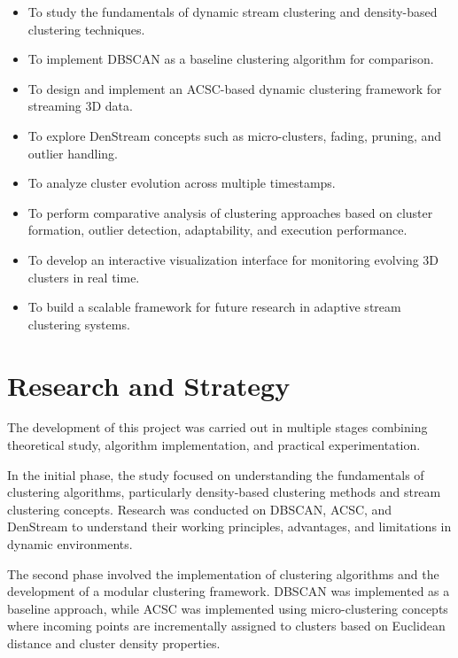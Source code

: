 \documentclass[12pt,a4paper]{report}
\begin{document}
\begin{itemize}

\item To study the fundamentals of dynamic stream clustering and density-based clustering techniques.

\item To implement DBSCAN as a baseline clustering algorithm for comparison.

\item To design and implement an ACSC-based dynamic clustering framework for streaming 3D data.

\item To explore DenStream concepts such as micro-clusters, fading, pruning, and outlier handling.

\item To analyze cluster evolution across multiple timestamps.

\item To perform comparative analysis of clustering approaches based on cluster formation, outlier detection, adaptability, and execution performance.

\item To develop an interactive visualization interface for monitoring evolving 3D clusters in real time.

\item To build a scalable framework for future research in adaptive stream clustering systems.

\end{itemize}

\section{Research and Strategy}

The development of this project was carried out in multiple stages combining theoretical study, algorithm implementation, and practical experimentation.

In the initial phase, the study focused on understanding the fundamentals of clustering algorithms, particularly density-based clustering methods and stream clustering concepts. Research was conducted on DBSCAN, ACSC, and DenStream to understand their working principles, advantages, and limitations in dynamic environments.

The second phase involved the implementation of clustering algorithms and the development of a modular clustering framework. DBSCAN was implemented as a baseline approach, while ACSC was implemented using micro-clustering concepts where incoming points are incrementally assigned to clusters based on Euclidean distance and cluster density properties.
\end{document}
